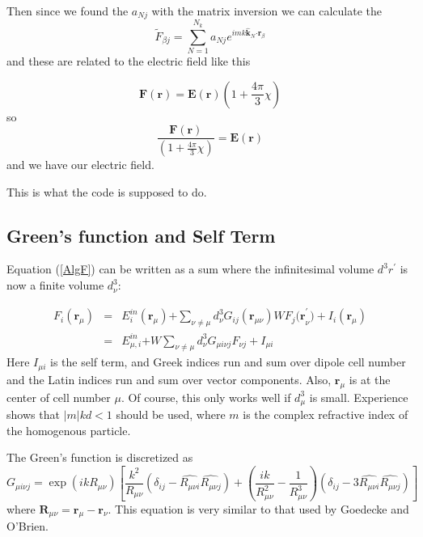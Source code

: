 \documentclass{article}
\begin{document}
Then since we found the $a_{Nj}$ with the matrix inversion we can calculate
the 
\begin{equation}
\tilde{F}_{\beta j}\mathbf{=}\sum_{N=1}^{N_{k}}a_{Nj}e^{imk\mathbf{\hat{k}}%
_{N}\mathbf{\cdot r}_{\beta }}
\end{equation}%
and these are related to the electric field like this

\[
\mathbf{F}(\mathbf{r})=\mathbf{E}(\mathbf{r})(1+\frac{4\pi }{3}\chi ) 
\]%
so 
\[
\frac{\mathbf{F}(\mathbf{r})}{(1+\frac{4\pi }{3}\chi )}=\mathbf{E}(\mathbf{r}%
) 
\]%
and we have our electric field.

This is what the code is supposed to do.

\subsection{Green's function and Self Term}

Equation (\ref{AlgF}) can be written as a sum where the infinitesimal volume 
$d^{3}r^{\prime }$ is now a finite volume $d_{\nu }^{3}$:

\begin{eqnarray}
F_{i}(\mathbf{r}_{\mu }) &=&E_{i}^{in}\left( \mathbf{r}_{\mu }\right) 
\mathbf{+}\sum\limits_{\nu \neq \mu }d_{\nu }^{3}G_{ij}\left( \mathbf{r}%
_{\mu \nu }\right) WF_{j}\mathbf{(r}_{\nu }^{\prime })+I_{i}(\mathbf{r}_{\mu
}) \\
&=&E_{\mu ,i}^{in}\mathbf{+}W\sum\limits_{\nu \neq \mu }d_{\nu }^{3}G_{\mu
i\nu j}F_{\nu j}+I_{\mu i}  \nonumber
\end{eqnarray}%
Here $I_{\mu i}$ is the self term, and Greek indices run and sum over dipole
cell number and the Latin indices run and sum over vector components. Also, $%
\mathbf{r}_{\mu }$ is at the center of cell number $\mu .$ Of course, this
only works well if $d_{\mu }^{3}$ is small. Experience shows that $%
\left\vert m\right\vert kd<1$ should be used, where $m$ is the complex
refractive index of the homogenous particle.

The Green's function is discretized as 
\begin{equation}
G_{\mu i\nu j}=\exp (ikR_{\mu \nu })\left[ \frac{k^{2}}{R_{\mu \nu }}\left(
\delta _{ij}-\widehat{R_{\mu \nu i}}\widehat{R_{\mu \nu j}}\right) +\left( 
\frac{ik}{R_{\mu \nu }^{2}}-\frac{1}{R_{\mu \nu }^{3}}\right) \left( \delta
_{ij}-3\widehat{R_{\mu \nu i}}\widehat{R_{\mu \nu j}}\right) \right]
\end{equation}
where $\mathbf{R}_{\mu \nu }=\mathbf{r}_{\mu }-\mathbf{r}_{\nu }.$ This
equation is very similar to that used by Goedecke and O'Brien.\cite%
{Goedecke88}
\end{document}
